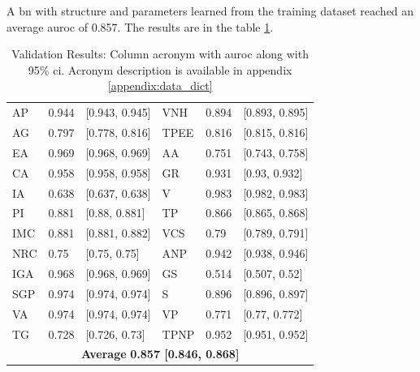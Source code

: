 
A \ac{bn} with structure and parameters learned from the training dataset reached an average \ac{auroc} of 0.857. The results are in the table \ref{tab:result_auc}.



\begin{table}[htpb]
 \caption{Validation Results: Column acronym with \ac{auroc} along with 95\% \ac{ci}. Acronym description is available in appendix \ref{appendix:data_dict}} \label{tab:result_auc} 

\renewcommand{\arraystretch}{1.2}
\centering
\begin{tabular} { p{1.5cm} p{1.5cm} p{3cm} p{1.5cm} p{1.5cm} l }
\hline
AP & 0.944 & [0.943, 0.945] & VNH & 0.894 & [0.893, 0.895] \\
AG & 0.797 & [0.778, 0.816] & TPEE & 0.816 & [0.815, 0.816] \\
EA & 0.969 & [0.968, 0.969] & AA & 0.751 & [0.743, 0.758] \\
CA & 0.958 & [0.958, 0.958] & GR & 0.931 & [0.93, 0.932] \\
IA & 0.638 & [0.637, 0.638] & V & 0.983 & [0.982, 0.983] \\
PI & 0.881 & [0.88, 0.881] & TP & 0.866 & [0.865, 0.868] \\
IMC & 0.881 & [0.881, 0.882] & VCS & 0.79 & [0.789, 0.791] \\
NRC & 0.75 & [0.75, 0.75] & ANP & 0.942 & [0.938, 0.946] \\
IGA & 0.968 & [0.968, 0.969] & GS & 0.514 & [0.507, 0.52] \\
SGP & 0.974 & [0.974, 0.974] & S & 0.896 & [0.896, 0.897] \\
VA & 0.974 & [0.974, 0.974] & VP & 0.771 & [0.77, 0.772] \\
TG & 0.728 & [0.726, 0.73] & TPNP & 0.952 & [0.951, 0.952] \\
\hline
 \multicolumn{6}{c}{\textbf{Average}  \textbf{0.857 [0.846, 0.868]}} \\

\hline
\end{tabular}
\end{table}


